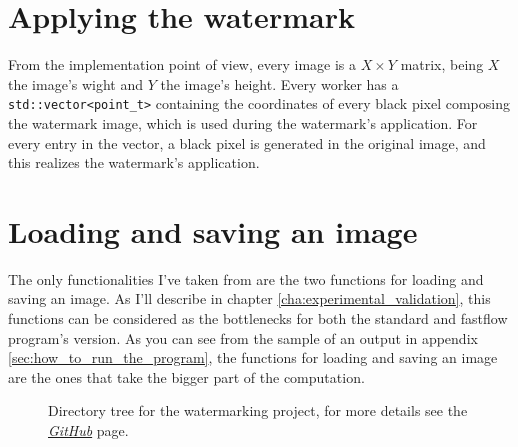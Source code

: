     \section{Applying the watermark} %
    \label{sec:applying_the_watermark}
        From the implementation point of view, every image is a $X{\times}Y$ matrix, being $X$ the image's wight
        and $Y$ the image's height. Every worker has a \texttt{std::vector<point\_t>} containing the coordinates
        of every black pixel composing the watermark image, which is used during the watermark's application.
        For every entry in the vector, a black pixel is generated in the original image, and this
        realizes the watermark's application.
    \section{Loading and saving an image} %
    \label{sec:loading_and_saving_an_image}
        The only functionalities I've taken from \cite{cimg} are the two functions for loading
        and saving an image. As I'll describe in chapter \ref{cha:experimental_validation}, this functions can
        be considered as the bottlenecks for both the standard and fastflow program's version. As you can see
        from the sample of an output in appendix \ref{sec:how_to_run_the_program}, the functions for loading
        and saving an image are the ones that take the bigger part of the computation.
    \begin{figure}[b!]
        \caption{Directory tree for the watermarking project, for more details see the
        \href{https://github.com/germz01/PDS_project}{\textit{GitHub}} page.}
        \label{fig:directory_tree}
    \end{figure}
